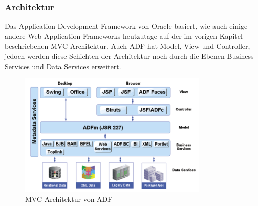 \subsubsection{Architektur}
Das Application Development Framework von Oracle basiert, wie auch einige andere Web Application Frameworks heutzutage auf der im vorigen Kapitel beschriebenen MVC-Architektur. 
Auch ADF hat Model, View und Controller, jedoch werden diese Schichten der Architektur noch durch die Ebenen Business Services und Data Services erweitert.
\begin{figure}[H]
\centering
\includegraphics[width=0.80\textwidth]{img/MVC-ADF3.png}
\caption {MVC-Architektur von ADF \autocite[S.22]{AUW2009}}
\label{fig:mvc-adf}
\end{figure}

